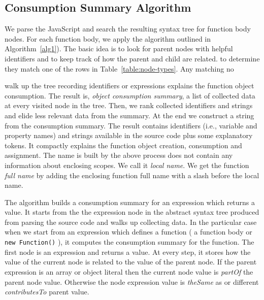 \documentclass[10pt, preprint]{sigplanconf}
\begin{document}
\subsection{Consumption Summary Algorithm}
\label{sec:nodewalk}


We parse the JavaScript and search the resulting syntax tree for function body nodes. For each function body, we apply the algorithm outlined in Algorithm~\ref{alg1}). The basic idea is to look for parent nodes with helpful identifiers and to keep track of how the parent and child are related. 
to determine they match one of the rows in Table~\ref{table:node-types}. Any matching no

walk up the tree recording identifiers or expressions explains the function object consumption. The result is, \textit{object consumption summary}, a list of collected data at every visited node in the tree. %
Then, we rank collected identifiers and strings and elide less relevant data from the summary. At the end we construct a string from the consumption summary. The result contains identifiers (i.e., variable and property names) and strings available in the source code plus some explanatory tokens. It compactly explains the function object creation, consumption and assignment. 
The name is built by the above process does not contain any information about enclosing scopes. We call it \textit{local name}. We get the function \textit{full name} by adding the enclosing function full name with a slash before the local name.

The algorithm builds a consumption summary for an expression which returns a value. It starts from the the expression node in the abstract syntax tree produced from parsing the source code and walks up  collecting data. In the particular case when we start from an expression which defines a function ( a function body or {\small\texttt{new Function()}} ), it computes the consumption summary for the function. The first node is an expression and returns a value. At every step, it stores how the value of the current node is related to the value of the parent node. If the parent expression is an array or object literal then the current node value is \textit{partOf} the parent node value. Otherwise the node expression value is \textit{theSame} as or different \textit{contributesTo} parent value. 
\end{document}
